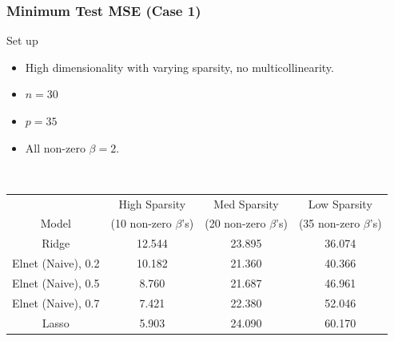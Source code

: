 \begin{frame}[fragile]
\frametitle{Minimum Test MSE (Case 1)}

\begin{block}{Set up}
    \begin{itemize}
        \item High dimensionality with varying sparsity, no multicollinearity. 
        \item $n = 30$
        \item $p = 35$
        \item All non-zero $\beta = 2$. 
    \end{itemize}
\end{block} \\

\begin{center}
    
    \begin{tabular}{||c c c c||} 
         \hline
          & High Sparsity & Med Sparsity & Low Sparsity \\ [0.5ex] 
          Model & (10 non-zero $\beta$'s) & (20 non-zero $\beta$'s) & (35 non-zero $\beta$'s) \\ [0.5ex]
         \hline\hline
         Ridge & 12.544 & 23.895 & \cellcolor{pink!60}36.074\\ 
         \hline
         Elnet (Naive), 0.2 & 10.182 & \cellcolor{pink!60}21.360 & 40.366 \\
         \hline
         Elnet (Naive), 0.5 & 8.760 & 21.687 & 46.961\\
        \hline
         Elnet (Naive), 0.7 & 7.421 & 22.380 & 52.046\\
        \hline
         Lasso & \cellcolor{pink!60}5.903 & 24.090 & 60.170\\
        \hline
    \end{tabular}

\end{center}
\end{frame}
